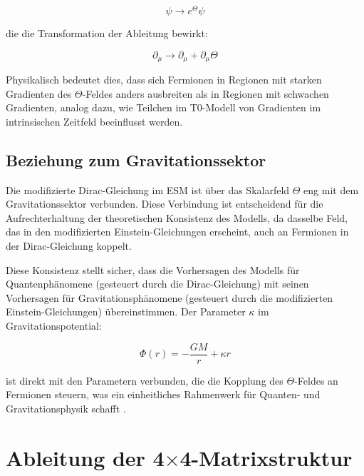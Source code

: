 \documentclass[12pt,a4paper]{article}
\begin{document}
	\begin{equation}
		\psi \rightarrow e^{\Theta}\psi
		\label{eq:field_redefinition}
	\end{equation}
	
	die die Transformation der Ableitung bewirkt:
	
	\begin{equation}
		\partial_{\mu} \rightarrow \partial_{\mu} + \partial_{\mu}\Theta
		\label{eq:derivative_transform}
	\end{equation}
	
	Physikalisch bedeutet dies, dass sich Fermionen in Regionen mit starken Gradienten des $\Theta$-Feldes anders ausbreiten als in Regionen mit schwachen Gradienten, analog dazu, wie Teilchen im T0-Modell von Gradienten im intrinsischen Zeitfeld beeinflusst werden.
	
	\subsection{Beziehung zum Gravitationssektor}
	\label{subsec:gravitational_relationship}
	
	Die modifizierte Dirac-Gleichung im ESM ist über das Skalarfeld $\Theta$ eng mit dem Gravitationssektor verbunden. Diese Verbindung ist entscheidend für die Aufrechterhaltung der theoretischen Konsistenz des Modells, da dasselbe Feld, das in den modifizierten Einstein-Gleichungen erscheint, auch an Fermionen in der Dirac-Gleichung koppelt.
	
	Diese Konsistenz stellt sicher, dass die Vorhersagen des Modells für Quantenphänomene (gesteuert durch die Dirac-Gleichung) mit seinen Vorhersagen für Gravitationsphänomene (gesteuert durch die modifizierten Einstein-Gleichungen) übereinstimmen. Der Parameter $\kappa$ im Gravitationspotential:
	
	\begin{equation}
		\Phi(r) = -\frac{GM}{r} + \kappa r
		\label{eq:modified_potential}
	\end{equation}
	
	ist direkt mit den Parametern verbunden, die die Kopplung des $\Theta$-Feldes an Fermionen steuern, was ein einheitliches Rahmenwerk für Quanten- und Gravitationsphysik schafft \cite{pascher_esm_comparison_2025}.
	
	\section{Ableitung der 4$\times$4-Matrixstruktur}
	\label{sec:matrix_structure}
	
\end{document}
